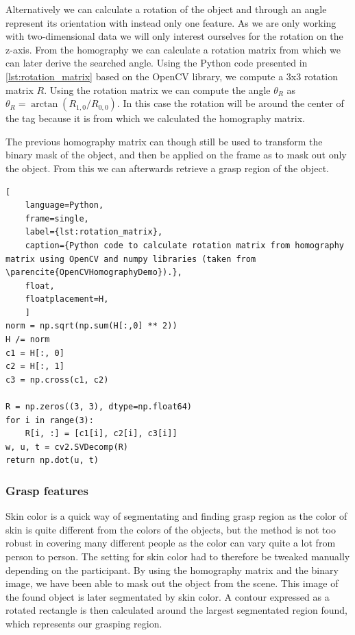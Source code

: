 Alternatively we can calculate a rotation of the object and through an angle represent its orientation with instead only one feature. As we are only working with two-dimensional data we will only interest ourselves for the rotation on the z-axis. From the homography we can calculate a rotation matrix from which we can later derive the searched angle. Using the Python code presented in \ref{lst:rotation_matrix} based on the OpenCV library, we compute a 3x3 rotation matrix \(R\). Using the rotation matrix we can compute the angle \(\theta_R\) as \(\theta_R = \arctan(R_{1,0} / R_{0,0})\). In this case the rotation will be around the center of the tag because it is from which we calculated the homography matrix.

The previous homography matrix can though still be used to transform the binary mask of the object, and then be applied on the frame as to mask out only the object. From this we can afterwards retrieve a grasp region of the object.

\begin{lstlisting}[
	language=Python,
	frame=single,
	label={lst:rotation_matrix},
	caption={Python code to calculate rotation matrix from homography matrix using OpenCV and numpy libraries (taken from \parencite{OpenCVHomographyDemo}).},
	float,
	floatplacement=H,
	]
norm = np.sqrt(np.sum(H[:,0] ** 2))
H /= norm
c1 = H[:, 0]
c2 = H[:, 1]
c3 = np.cross(c1, c2)

R = np.zeros((3, 3), dtype=np.float64)
for i in range(3):
	R[i, :] = [c1[i], c2[i], c3[i]]
w, u, t = cv2.SVDecomp(R)
return np.dot(u, t)
\end{lstlisting}

\subsubsection{Grasp features}

Skin color is a quick way of segmentating and finding grasp region as the color of skin is quite different from the colors of the objects, but the method is not too robust in covering many different people as the color can vary quite a lot from person to person. The setting for skin color had to therefore be tweaked manually depending on the participant. By using the homography matrix and the binary image, we have been able to mask out the object from the scene. This image of the found object is later segmentated by skin color. A contour expressed as a rotated rectangle is then calculated around the largest segmentated region found, which represents our grasping region.

